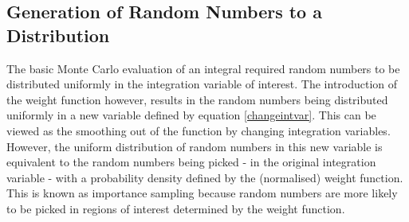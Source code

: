 \subsection{Generation of Random Numbers to a Distribution}\label{mcdist}

The basic Monte Carlo evaluation of an integral required random numbers to be distributed uniformly in the integration variable of interest. The introduction of the weight function however, results in the random numbers being distributed uniformly in a new variable defined by equation \ref{changeintvar}. This can be viewed as the smoothing out of the function by changing integration variables. However, the uniform distribution of random numbers in this new variable is equivalent to the random numbers being picked - in the original integration variable - with a probability density defined by the (normalised) weight function. This is known as importance sampling because random numbers are more likely to be picked in regions of interest determined by the weight function.

